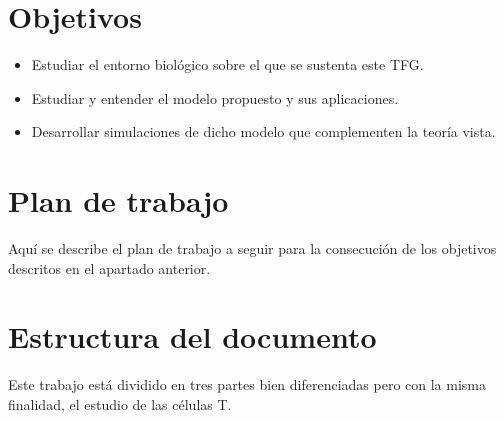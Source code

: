 \section{Objetivos}
 \begin{itemize}
 	\item Estudiar el entorno biológico sobre el que se sustenta este TFG.
 	\item Estudiar y entender el modelo propuesto y sus aplicaciones. 
 	\item Desarrollar simulaciones de dicho modelo que complementen la teoría vista.
 \end{itemize}


\section{Plan de trabajo}
Aquí se describe el plan de trabajo a seguir para la consecución de los objetivos descritos en el apartado anterior.

\section{Estructura del documento}

Este trabajo está dividido en tres partes bien diferenciadas pero con la misma finalidad, el estudio de las células T. 

